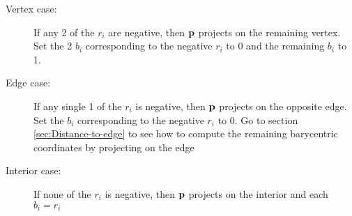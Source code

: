 \begin{description}

\item[Vertex case:]
If any 2 of the $r_i$ are negative,
then ${\mathbf p}$ projects on the remaining vertex.
Set the 2 $b_i$ corresponding to the negative $r_i$
to 0 and the remaining $b_i$ to 1.

\item[Edge case:]
If any single 1 of the $r_i$ is negative,
then ${\mathbf p}$ projects on the opposite edge.
Set the $b_i$ corresponding to the negative $r_i$
to 0.
Go to section \ref{sec:Distance-to-edge} to see
how to compute the remaining barycentric coordinates
by projecting on the edge

\item[Interior case:]
If none of the $r_i$ is negative,
then ${\mathbf p}$ projects on the interior
and each $b_i = r_i$

\end{description}
